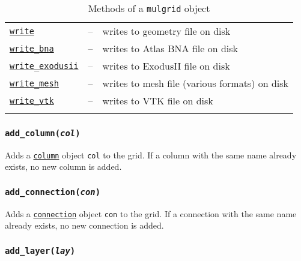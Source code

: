 \begin{center}
\begin{longtable}{|l|l|p{70mm}|}
  \hyperref[sec:mulgrid:write]{\texttt{write}} & -- & writes to geometry file on disk\\
  \hyperref[sec:mulgrid:write_bna]{\texttt{write\_bna}} & -- & writes to Atlas BNA file on disk\\ 
  \hyperref[sec:mulgrid:write_exodusii]{\texttt{write\_exodusii}} &  -- & writes to ExodusII file on disk\\
  \hyperref[sec:mulgrid:write_mesh]{\texttt{write\_mesh}} &  -- & writes to mesh file (various formats) on disk\\
  \hyperref[sec:mulgrid:write_vtk]{\texttt{write\_vtk}} &  -- & writes to VTK file on disk\\
  \hline
  \caption{Methods of a \texttt{mulgrid} object}
  \label{tb:mulgrid_methods}
\end{longtable}
\end{center}

\begin{snugshade}\subsubsection{\texttt{add\_column(\emph{col})}}\end{snugshade}
\label{sec:mulgrid:add_column}

Adds a \hyperref[columnobjects]{\texttt{column}} object \texttt{col}
to the grid. If a column with the same name already exists, no new
column is added.

\begin{snugshade}\subsubsection{\texttt{add\_connection(\emph{con})}}\end{snugshade}
\label{sec:mulgrid:add_connection}

Adds a \hyperref[connectionobjects]{\texttt{connection}} object
\texttt{con} to the grid. If a connection with the same name already
exists, no new connection is added.

\begin{snugshade}\subsubsection{\texttt{add\_layer(\emph{lay})}}\end{snugshade}
\label{sec:mulgrid:add_layer}

